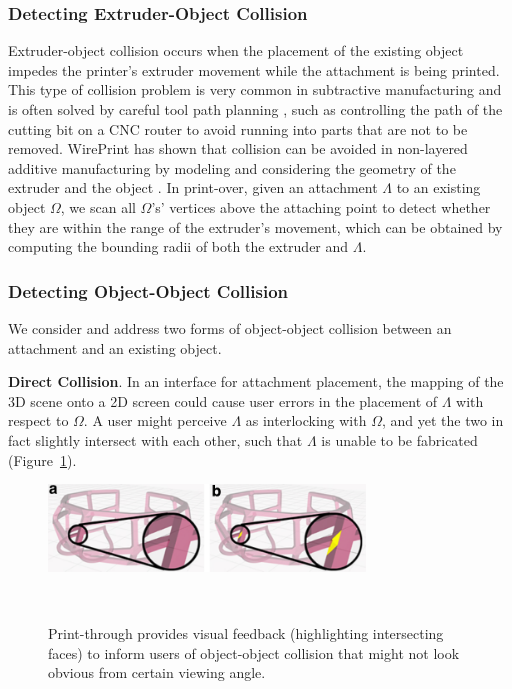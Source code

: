 \subsubsection{Detecting Extruder-Object Collision}
Extruder-object collision occurs when the placement of the existing object impedes the printer's extruder movement while the attachment is being printed. This type of collision problem is very common in subtractive manufacturing and is often solved by careful tool path planning \cite{chih1998new, lin1996efficient}, such as controlling the path of the cutting bit on a CNC router to avoid running into parts that are not to be removed. WirePrint has shown that collision can be avoided in non-layered additive manufacturing by modeling and considering the geometry of the extruder and the object \cite{mueller2014wireprint}. In print-over, given an attachment $\Lambda$ to an existing object $\Omega$, we scan all $\Omega$'s' vertices above the attaching point to detect whether they are within the range of the extruder's movement, which can be obtained by computing the bounding radii of both the extruder and $\Lambda$.

\subsubsection{Detecting Object-Object Collision}
We consider and address two forms of object-object collision between an attachment and an existing object.

\textbf{Direct Collision}. In an interface for attachment placement, the mapping of the 3D scene onto a 2D screen could cause user errors in the placement of $\Lambda$ with respect to $\Omega$. A user might perceive $\Lambda$ as interlocking with $\Omega$, and yet the two in fact slightly intersect with each other, such that $\Lambda$ is unable to be fabricated (Figure~\ref{fig:encore_feedback}).

\begin{figure}[h]
  \centering
  \includegraphics[width=0.75\textwidth]{figures/encore_feedback.pdf}
  \caption{Print-through provides visual feedback (highlighting intersecting faces) to inform users of object-object collision that might not look obvious from certain viewing angle. }~\label{fig:encore_feedback}
\end{figure}


